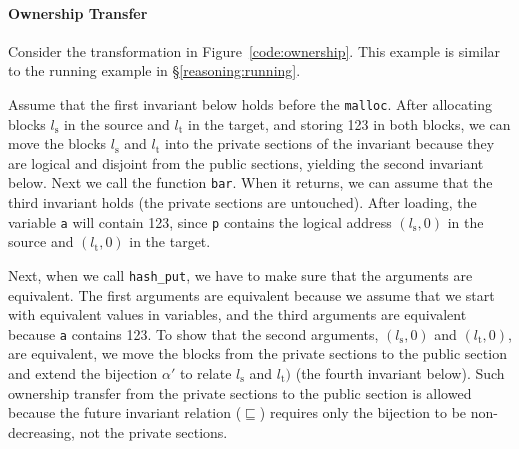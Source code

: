 \paragraph{Ownership Transfer}

Consider the transformation in Figure~\ref{code:ownership}.  This
example is similar to the running example in
\S\ref{reasoning:running}.

Assume that the first invariant below holds before the \texttt{malloc}.  After
allocating blocks $l_\text{s}$ in the source and $l_\text{t}$ in
the target, and storing 123 in both blocks, we can move the blocks $l_\text{s}$
and $l_\text{t}$ into the private sections of the invariant because they are logical and disjoint from the
public sections, yielding the second invariant below. Next we call the function \texttt{bar}. When it
returns, we can assume that the third invariant holds (\ie the
private sections are untouched). After loading, the variable
\texttt{a} will contain 123, since \texttt{p} contains the
logical address $(l_\text{s},0)$ in the source and $(l_\text{t},0)$ in
the target. 

Next, when we call \texttt{hash\_put}, we have to make sure that the
arguments are equivalent. The first arguments are equivalent because
we assume that we start with equivalent values in variables, and the third arguments
are equivalent because \texttt{a} contains 123.  To show that
the second arguments, $(l_\text{s},0)$ and $(l_\text{t},0)$, are
equivalent, we move the blocks from the private sections to the public
section and extend the bijection $\alpha'$ to relate $l_\text{s}$
and $l_\text{t})$ (the fourth invariant below). Such ownership
transfer from the private sections to the public section is allowed
because the future invariant relation ($\sqsubseteq$) requires
only the bijection to be non-decreasing, not the private
sections.
\begin{center}
\hfill
{}\hfill
{}\hfill
{}
\end{center}


